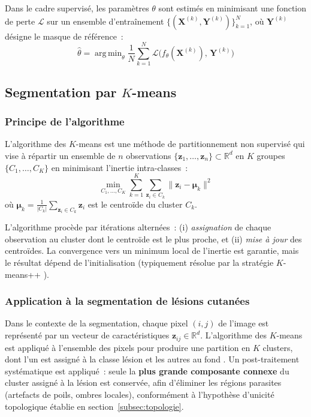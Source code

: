 \documentclass[12pt,a4paper]{article}
\newcommand{\R}{\mathbb{R}}
\DeclareMathOperator*{\argmin}{arg\,min}
\begin{document}
Dans le cadre supervisé, les paramètres $\theta$ sont estimés en minimisant une fonction de perte $\mathcal{L}$ sur un ensemble d'entraînement $\{(\mathbf{X}^{(k)}, \mathbf{Y}^{(k)})\}_{k=1}^{N}$, où $\mathbf{Y}^{(k)}$ désigne le masque de référence~:
\begin{equation}
    \hat{\theta} = \argmin_\theta \frac{1}{N} \sum_{k=1}^{N} \mathcal{L}\big(f_\theta(\mathbf{X}^{(k)}),\, \mathbf{Y}^{(k)}\big)
    \label{eq:optim}
\end{equation}

\subsection{Segmentation par $K$-means}
\label{subsec:kmeans}

\subsubsection{Principe de l'algorithme}

L'algorithme des $K$-means \citep{macqueen1967kmeans} est une méthode de partitionnement non supervisé qui vise à répartir un ensemble de $n$ observations $\{\mathbf{z}_1, \ldots, \mathbf{z}_n\} \subset \R^d$ en $K$ groupes $\{C_1, \ldots, C_K\}$ en minimisant l'inertie intra-classes~:
\begin{equation}
    \min_{C_1, \ldots, C_K} \sum_{k=1}^{K} \sum_{\mathbf{z}_i \in C_k} \|\mathbf{z}_i - \boldsymbol{\mu}_k\|^2
    \label{eq:kmeans}
\end{equation}
où $\boldsymbol{\mu}_k = \frac{1}{|C_k|} \sum_{\mathbf{z}_i \in C_k} \mathbf{z}_i$ est le centroïde du cluster $C_k$.

L'algorithme procède par itérations alternées~: (i) \emph{assignation} de chaque observation au cluster dont le centroïde est le plus proche, et (ii) \emph{mise à jour} des centroïdes. La convergence vers un minimum local de l'inertie est garantie, mais le résultat dépend de l'initialisation (typiquement résolue par la stratégie $K$-means++ \citep{arthur2007kmeans++}).

\subsubsection{Application à la segmentation de lésions cutanées}

Dans le contexte de la segmentation, chaque pixel $(i, j)$ de l'image est représenté par un vecteur de caractéristiques $\mathbf{z}_{ij} \in \R^d$. L'algorithme des $K$-means est appliqué à l'ensemble des pixels pour produire une partition en $K$ clusters, dont l'un est assigné à la classe \og lésion \fg{} et les autres au \og fond \fg{}. Un post-traitement systématique est appliqué~: seule la \textbf{plus grande composante connexe} du cluster assigné à la lésion est conservée, afin d'éliminer les régions parasites (artefacts de poils, ombres locales), conformément à l'hypothèse d'unicité topologique établie en section~\ref{subsec:topologie}.
\end{document}
